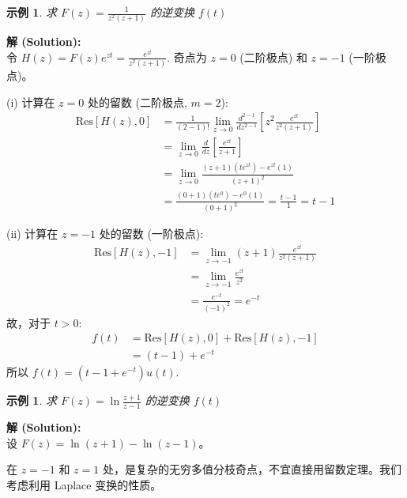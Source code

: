 \documentclass[linespread=1.5,openany]{book}%
\def\diff{d}%
\theoremstyle{plain}
\newtheorem{example}[theorem]{示例}
\newcommand{\diff}{\mathop{}\!\mathrm{d}}  %
\begin{document}
{{{{{{{									
									\begin{example}求 $F(z) = \frac{1}{z^2(z+1)}$ 的逆变换 $f(t)$ \label{ex:L16_inv_laplace_ex4}
									\end{example}
									\noindent\textbf{解 (Solution):} \\
									令 $H(z) = F(z)e^{zt} = \frac{e^{zt}}{z^2(z+1)}$.
									奇点为 $z=0$ (二阶极点) 和 $z=-1$ (一阶极点)。
									
									(i) 计算在 $z=0$ 处的留数 (二阶极点, $m=2$):
									\begin{align*}
										\text{Res}[H(z), 0] &= \frac{1}{(2-1)!} \lim_{z\to 0} \frac{\diff^{2-1}}{\diff z^{2-1}} \left[ z^2 \frac{e^{zt}}{z^2(z+1)} \right] \\[6pt]
										&= \lim_{z\to 0} \frac{\diff}{\diff z} \left[ \frac{e^{zt}}{z+1} \right] \\[6pt]
										&= \lim_{z\to 0} \frac{(z+1)(te^{zt}) - e^{zt}(1)}{(z+1)^2} \\[6pt]
										&= \frac{(0+1)(te^{0}) - e^{0}(1)}{(0+1)^2} = \frac{t-1}{1} = t-1
									\end{align*}
									
									(ii) 计算在 $z=-1$ 处的留数 (一阶极点):
									\begin{align*}
										\text{Res}[H(z), -1] &= \lim_{z\to -1} (z+1) \frac{e^{zt}}{z^2(z+1)} \\[6pt]
										&= \lim_{z\to -1} \frac{e^{zt}}{z^2} \\[6pt]
										&= \frac{e^{-t}}{(-1)^2} = e^{-t}
									\end{align*}
									故，对于 $t>0$:
									\begin{align*}
										f(t) &= \text{Res}[H(z), 0] + \text{Res}[H(z), -1] \\
										&= (t-1) + e^{-t}
									\end{align*}
									所以 $f(t) = (t-1+e^{-t})u(t)$.
									\vspace{\baselineskip}
									
									\begin{example}求 $F(z) = \ln\frac{z+1}{z-1}$ 的逆变换 $f(t)$ \label{ex:L16_inv_laplace_ex5}
									\end{example}
									\noindent\textbf{解 (Solution):} \\
									设 \( F(z) = \ln(z+1) - \ln(z-1) \)。
									
									在 \( z = -1 \) 和 \( z = 1 \) 处，是复杂的无穷多值分枝奇点，不宜直接用留数定理。我们考虑利用 Laplace 变换的性质。
									
}}}}}}}
\end{document}
